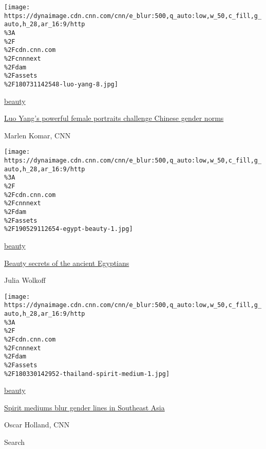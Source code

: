 \href{/style/article/luo-yang-girls-chinese-women/index.html}{}

\texttt{[image: https://dynaimage.cdn.cnn.com/cnn/e\_blur:500,q\_auto:low,w\_50,c\_fill,g\_auto,h\_28,ar\_16:9/http\\\%3A\\\%2F\\\%2Fcdn.cnn.com\\\%2Fcnnnext\\\%2Fdam\\\%2Fassets\\\%2F180731142548-luo-yang-8.jpg]}

\href{/style/beauty}{beauty}

\href{/style/article/luo-yang-girls-chinese-women/index.html}{Luo Yang's
powerful female portraits challenge Chinese gender norms}

Marlen Komar, CNN

\href{/style/article/ancient-egypt-beauty-ritual-artsy/index.html}{}

\texttt{[image: https://dynaimage.cdn.cnn.com/cnn/e\_blur:500,q\_auto:low,w\_50,c\_fill,g\_auto,h\_28,ar\_16:9/http\\\%3A\\\%2F\\\%2Fcdn.cnn.com\\\%2Fcnnnext\\\%2Fdam\\\%2Fassets\\\%2F190529112654-egypt-beauty-1.jpg]}

\href{/style/beauty}{beauty}

\href{/style/article/ancient-egypt-beauty-ritual-artsy/index.html}{Beauty
secrets of the ancient Egyptians}

Julia Wolkoff

\href{/style/article/transcendents-southeast-asia-spirit-mediums/index.html}{}

\texttt{[image: https://dynaimage.cdn.cnn.com/cnn/e\_blur:500,q\_auto:low,w\_50,c\_fill,g\_auto,h\_28,ar\_16:9/http\\\%3A\\\%2F\\\%2Fcdn.cnn.com\\\%2Fcnnnext\\\%2Fdam\\\%2Fassets\\\%2F180330142952-thailand-spirit-medium-1.jpg]}

\href{/style/beauty}{beauty}

\href{/style/article/transcendents-southeast-asia-spirit-mediums/index.html}{Spirit
mediums blur gender lines in Southeast Asia}

Oscar Holland, CNN

Search

